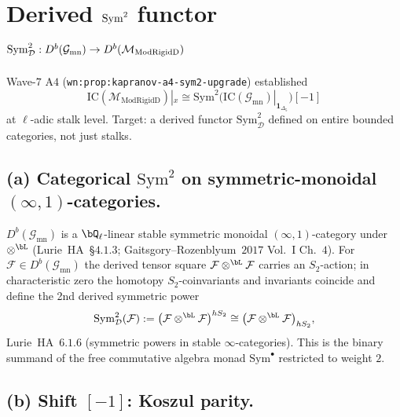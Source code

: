 \section{Derived $\Sym^2$ functor $\Sym^2_{\cD}:D^b(\cG_{\mathrm{mn}})\to D^b(\cM_{\ModRigidD})$}
\label{wn:sec:wave9-o2-derived-sym2}

\providecommand{\IC}{\mathrm{IC}}
\providecommand{\ModRigidD}{\mathrm{ModRigidD}}
\providecommand{\KS}{\mathrm{KS}}
\providecommand{\Sym}{\mathrm{Sym}}
\providecommand{\Perv}{\mathrm{Perv}}
\providecommand{\cD}{\mathcal{D}}
\providecommand{\cM}{\mathcal{M}}
\providecommand{\cG}{\mathcal{G}}
\providecommand{\cF}{\mathcal{F}}
\providecommand{\cL}{\mathcal{L}}
\providecommand{\cA}{\mathcal{A}}
\providecommand{\SymTwo}{\Sym^2_{\cD}}

Wave-$7$ A$4$ (\texttt{wn:prop:kapranov-a4-sym2-upgrade}) established
\[
  \IC(\cM_{\ModRigidD})|_x
  \cong
  \Sym^2\!\big(\IC(\cG_{\mathrm{mn}})|_{\mathbf 1_{\Delta_5}}\big)[-1]
\]
at $\ell$-adic stalk level. Target: a derived functor $\SymTwo$
defined on entire bounded categories, not just stalks.

\subsection*{(a) Categorical $\Sym^2$ on symmetric-monoidal
$(\infty,1)$-categories.}

$D^b(\cG_{\mathrm{mn}})$ is a $\bQ_\ell$-linear stable symmetric
monoidal $(\infty,1)$-category under $\otimes^{\bL}$
(Lurie~HA~\S$4.1.3$; Gaitsgory--Rozenblyum~$2017$ Vol.~I Ch.~$4$).
For $\cF\in D^b(\cG_{\mathrm{mn}})$ the derived tensor square
$\cF\otimes^{\bL}\cF$ carries an $S_2$-action; in characteristic
zero the homotopy $S_2$-coinvariants and invariants coincide and
define the 2nd derived symmetric power
\begin{equation}
  \label{wn:eq:wave9-o2-sym2-def}
  \SymTwo(\cF)
  :=
  \big(\cF\otimes^{\bL}\cF\big)^{hS_2}
  \cong
  \big(\cF\otimes^{\bL}\cF\big)_{hS_2},
\end{equation}
Lurie~HA~$6.1.6$ (symmetric powers in stable $\infty$-categories).
This is the binary summand of the free commutative algebra monad
$\mathrm{Sym}^{\bullet}$ restricted to weight $2$.

\subsection*{(b) Shift $[-1]$: Koszul parity.}

